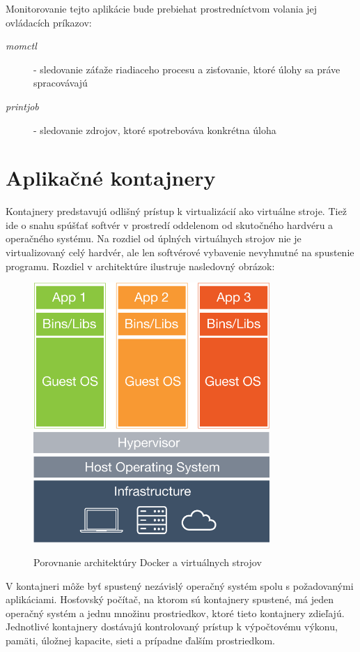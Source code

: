 \documentclass[11pt,final,oneside]{fithesis}
\begin{document}
Monitorovanie tejto aplikácie bude prebiehat prostredníctvom volania jej ovládacích príkazov:
\begin{description}
\item[\emph{momctl}] - sledovanie záťaže riadiaceho procesu a zisťovanie, ktoré úlohy sa práve spracovávajú
\item[\emph{printjob}] - sledovanie zdrojov, ktoré spotrebováva konkrétna úloha 
\end{description}



\section{Aplikačné kontajnery}
Kontajnery predstavujú odlišný prístup k virtualizácií ako virtuálne stroje. Tiež ide o snahu spúšťať softvér v prostredí oddelenom od skutočného hardvéru a operačného systému. Na rozdiel od úplných virtuálnych strojov 
nie je virtualizovaný celý hardvér, ale len softvérové vybavenie nevyhnutné na spustenie programu. Rozdiel v architektúre ilustruje nasledovný obrázok: 
\begin{figure}[h]
\begin{center}
       \includegraphics[width=0.8\textwidth]{images/docker.png}
       \caption{Porovnanie architektúry Docker a virtuálnych strojov}\cite{docker}
\end{center}
\end{figure}
V kontajneri môže byť spustený nezávislý operačný systém spolu s požadovanými aplikáciami. Hosťovský počítač, na ktorom sú kontajnery spustené, má jeden operačný systém a jednu množinu prostriedkov, 
ktoré tieto kontajnery zdieľajú. Jednotlivé kontajnery dostávajú kontrolovaný prístup k výpočtovému výkonu, pamäti, úložnej kapacite, sieti a prípadne ďalším prostriedkom.
\end{document}
